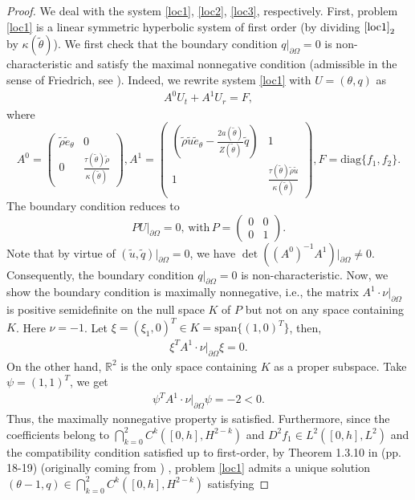 \documentclass[11pt,reqno]{amsart}
\numberwithin{equation}{section}
\begin{document}
\begin{proof}
 We deal with the system \eqref{loc1}, \eqref{loc2}, \eqref{loc3}, respectively. First, problem \eqref{loc1} is a linear symmetric hyperbolic system of first order (by dividing $\eqref{loc1}_2$ by $\kappa(\tilde \theta)$).  We first check that the boundary condition $q|_{\partial\Omega}=0$ is non-characteristic and satisfy the maximal nonnegative condition (admissible in the sense of Friedrich, see \cite{Zheng, Friedrichs}). Indeed,  we rewrite system \eqref{loc1} with $U=(\theta, q)$ as
 \begin{align}
 A^0 U_t+A^1 U_r=F,
 \end{align}
 where
 \[
 A^0=
 \begin{pmatrix}
 \tilde \rho \tilde e_\theta &0\\
 0& \frac{\tau(\tilde \theta) \tilde \rho}{\kappa (\tilde \theta)}
 \end{pmatrix},
 A^1=
 \begin{pmatrix}
 \left(\tilde \rho \tilde u \tilde e_\theta-\frac{2a(\tilde \theta)}{Z(\tilde \theta)} \tilde q\right) & 1\\
 1&  \frac{\tau (\tilde \theta) \tilde \rho \tilde u}{\kappa (\tilde \theta)}
 \end{pmatrix}, F=\mathrm{diag }\{f_1, f_2\}.
 \]
 The boundary condition reduces to
 \[
 P U|_{\partial \Omega}=0,\,  \text{with} \,  P=
 \begin{pmatrix}
 0&0\\
 0&1
 \end{pmatrix}.
 \]
 Note that by virtue of $(\tilde u, \tilde q)|_{\partial \Omega}=0$, we have $\det \left( (A^0)^{-1} A^1\right)|_{\partial \Omega} \neq 0$. Consequently, the boundary condition $q|_{\partial \Omega}=0$ is non-characteristic. Now, we show the boundary condition is maximally nonnegative, i.e., the matrix $A^1 \cdot \nu|_{\partial\Omega}$ is positive semidefinite on the null space $K$ of $P$ but not on any space containing $K$. Here $\nu=-1$. Let $\xi=(\xi_1,0)^T \in K = \mathrm{span} \{(1,0)^T\}$, then,
\begin{align*}
\xi^TA^1\cdot\nu|_{\partial\Omega}\xi=0.
\end{align*}
On the other hand, $\mathbb R^2$ is the only space containing $K$ as a proper subspace.  Take $\psi=(1,1)^T$, we get
\begin{align*}
\psi ^TA^1\cdot\nu|_{\partial\Omega}\psi=-2<0.
\end{align*}
Thus, the maximally nonnegative property is satisfied.  Furthermore, since the coefficients belong to $\bigcap\limits_{k=0}^2 C^k ([0,h], H^{2-k})$ and $D^2 f_1 \in L^2([0,h], L^2)$ and the compatibility condition satisfied up to first-order, by Theorem 1.3.10 in \cite{Zheng} (pp. 18-19) (originally coming from \cite{RM74}) , problem \eqref{loc1} admits a unique solution $(\theta-1, q)\in \bigcap\limits _{k=0}^2C^k([0,h], H^{2-k})$ satisfying

\end{proof}
\end{document}
